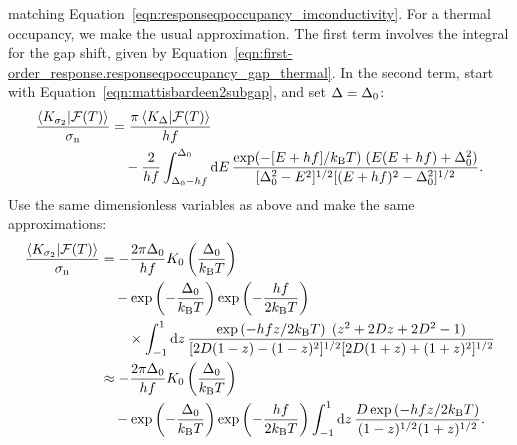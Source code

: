 matching Equation~\ref{eqn:responseqpoccupancy_imconductivity}.
For a thermal occupancy, we make the usual approximation.
The first term involves the integral for the gap shift, given by Equation~\ref{eqn:first-order_response.responseqpoccupancy_gap_thermal}.
In the second term, start with Equation~\ref{eqn:mattisbardeen2subgap}, and set $\Delta = \Delta_0$:
\begin{align}
\begin{split}
\frac{\braket{K_{\sigma_2}}{\mathcal{F}(T)}}{\sigma_{\mathrm{n}}}
  &=
  \frac{\pi \braket{K_{\Delta}}{\mathcal{F}(T)}}{h f} \\
  &\quad
  - \frac{2}{h f} \int_{\Delta_0 - h f}^{\Delta_0} \dd{E}
  \frac{\exp(-[E + h f] / k_\mathrm{B} T) \; (E (E + h f) + \Delta_0^2)}
  {[\Delta_0^2 - E^2]^{1/2} [(E + h f)^2 - \Delta_0^2]^{1/2}}.
\end{split}
\end{align}
Use the same dimensionless variables as above and make the same approximations:
\begin{align}
\begin{split}
\frac{\braket{K_{\sigma_2}}{\mathcal{F}(T)}}{\sigma_{\mathrm{n}}}
  &=
  -\frac{2 \pi \Delta_0}{h f}
  K_0 \left( \frac{\Delta_0}{k_\mathrm{B} T} \right) \\
  &\quad
  - \exp \left( -\frac{\Delta_0}{k_\mathrm{B} T} \right)
  \exp \left( -\frac{h f}{2 k_\mathrm{B} T} \right) \\
  &\qquad \times
  \int_{-1}^{1} \dd{z}
  \frac{\exp \left( -h f z / 2 k_\mathrm{B} T \right) \; (z^2 + 2 D z + 2 D^2 - 1)}{[2 D (1 - z) - (1 - z)^2]^{1/2} [2 D (1 + z) + (1 + z)^2]^{1/2}} \\
  &\approx
  -\frac{2 \pi \Delta_0}{h f}
  K_0 \left( \frac{\Delta_0}{k_\mathrm{B} T} \right) \\
  &\quad - \exp \left( -\frac{\Delta_0}{k_\mathrm{B} T} \right)
  \exp \left( -\frac{h f}{2 k_\mathrm{B} T} \right)
  \int_{-1}^{1} \dd{z}
  \frac{D \exp \left( -h f z / 2 k_\mathrm{B} T \right)}{(1 - z)^{1/2} (1 + z)^{1/2}}.
\end{split}
\end{align}
